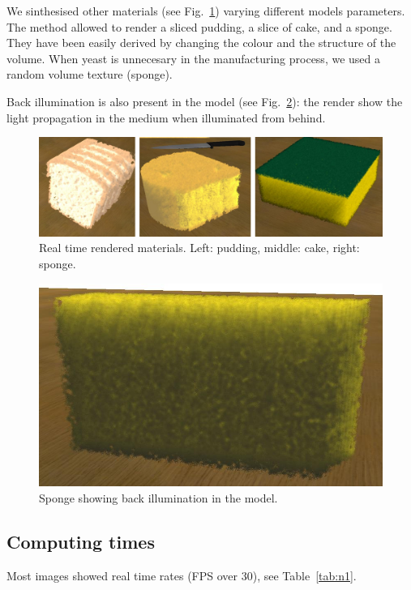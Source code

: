 \documentclass[oneside,a4paper,english,links]{amca}
\begin{document}
We sinthesised other materials (see
Fig.~\ref{fg:fig6}) varying different
models parameters. The method allowed to render a sliced pudding, a slice
of cake, and a sponge. They have been
easily derived by changing the colour and the structure of the volume. When yeast is unnecesary in the manufacturing process, we used a random volume texture (sponge).

Back illumination is also present in the model (see Fig.~\ref{fg:fig7}): the render show the light propagation in the medium when illuminated from behind.

\begin{figure}[htb!]
  \centerline{\includegraphics[scale=0.3]{fig6}}
  \caption{Real time rendered materials. Left: pudding, middle: cake, right: sponge. }
  \label{fg:fig6}
\end{figure}



\begin{figure}[htb!]
  \centerline{\includegraphics[scale=0.25]{fig7}}
  \caption{Sponge showing back illumination in the model. }
  \label{fg:fig7}
\end{figure}


\subsection{Computing times}
Most images showed real time rates (FPS over 30), see Table~\ref{tab:n1}.
\end{document}
